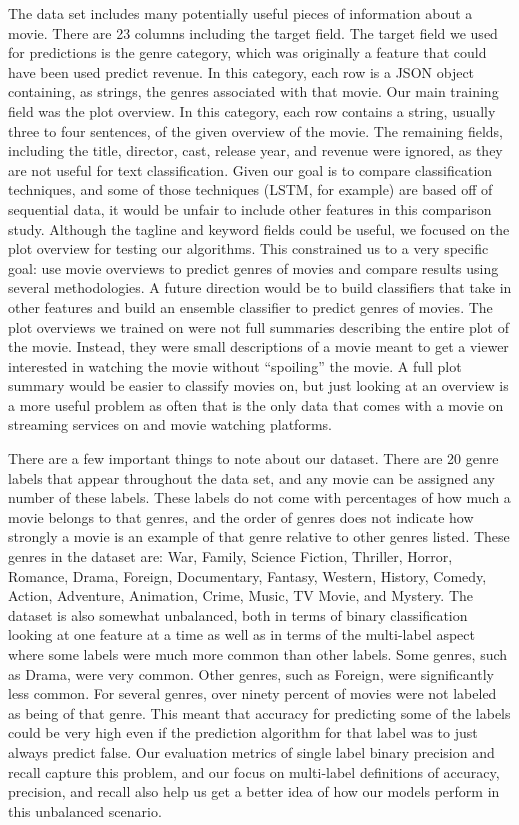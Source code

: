 \documentclass[sigconf]{acmart}
\begin{document}
The data set includes many potentially useful pieces of information about a movie. There are 23 columns including the target field. The target field we used for predictions is the genre category, which was originally a feature that could have been used predict revenue. In this category, each row is a JSON object containing, as strings, the genres associated with that movie. Our main training field was the plot overview. In this category, each row contains a string, usually three to four sentences, of the given overview of the movie. The remaining fields, including the title, director, cast, release year, and revenue were ignored, as they are not useful for text classification. Given our goal is to compare classification techniques, and some of those techniques (LSTM, for example) are based off of sequential data, it would be unfair to include other features in this comparison study. Although the tagline and keyword fields could be useful, we focused on the plot overview for testing our algorithms. This constrained us to a very specific goal: use movie overviews to predict genres of movies and compare results using several methodologies. A future direction would be to build classifiers that take in other features and build an ensemble classifier to predict genres of movies. The plot overviews we trained on were not full summaries describing the entire plot of the movie.  Instead, they were small descriptions of a movie meant to get a viewer interested in watching the movie without ``spoiling'' the movie.  A full plot summary would be easier to classify movies on, but just looking at an overview is a more useful problem as often that is the only data that comes with a movie on streaming services on and movie watching platforms. 

There are a few important things to note about our dataset.  There are 20 genre labels that appear throughout the data set, and any movie can be assigned any number of these labels.  These labels do not come with percentages of how much a movie belongs to that genres, and the order of genres does not indicate how strongly a movie is an example of that genre relative to other genres listed.  These genres in the dataset are: War, Family, Science Fiction, Thriller, Horror, Romance, Drama, Foreign, Documentary, Fantasy, Western, History, Comedy, Action, Adventure, Animation, Crime, Music, TV Movie, and Mystery. The dataset is also somewhat unbalanced, both in terms of binary classification looking at one feature at a time as well as in terms of the multi-label aspect where some labels were much more common than other labels.  Some genres, such as Drama, were very common.  Other genres, such as Foreign, were significantly less common. For several genres, over ninety percent of movies were not labeled as being of that genre. This meant that accuracy for predicting some of the labels could be very high even if the prediction algorithm for that label was to just always predict false.  Our evaluation metrics of single label binary precision and recall capture this problem, and our focus on multi-label definitions of accuracy, precision, and recall also help us get a better idea of how our models perform in this unbalanced scenario. 
\end{document}
